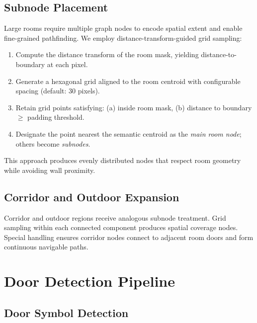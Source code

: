 \documentclass[manuscript,screen,review]{acmart}
\begin{document}

\subsection{Subnode Placement}
\label{subsec:subnodes}

Large rooms require multiple graph nodes to encode spatial extent and enable fine-grained pathfinding. We employ distance-transform-guided grid sampling:

\begin{enumerate}
    \item Compute the distance transform of the room mask, yielding distance-to-boundary at each pixel.
    \item Generate a hexagonal grid aligned to the room centroid with configurable spacing (default: 30 pixels).
    \item Retain grid points satisfying: (a) inside room mask, (b) distance to boundary $\geq$ padding threshold.
    \item Designate the point nearest the semantic centroid as the \emph{main room node}; others become \emph{subnodes}.
\end{enumerate}

This approach produces evenly distributed nodes that respect room geometry while avoiding wall proximity.

\subsection{Corridor and Outdoor Expansion}
\label{subsec:expansion}

Corridor and outdoor regions receive analogous subnode treatment. Grid sampling within each connected component produces spatial coverage nodes. Special handling ensures corridor nodes connect to adjacent room doors and form continuous navigable paths.

\section{Door Detection Pipeline}
\label{sec:doors}

\subsection{Door Symbol Detection}
\label{subsec:door_detection}
\end{document}
